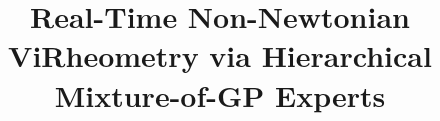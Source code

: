 \documentclass[acmtog,anonymous,review]{acmart}
\begin{document}
\title{Real-Time Non-Newtonian ViRheometry via Hierarchical Mixture-of-GP Experts}


\end{document}
